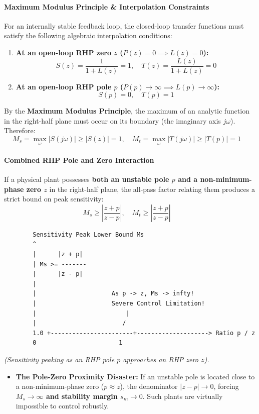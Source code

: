 \documentclass[12pt,onecolumn,twoside ]{article}
\begin{document}
	\paragraph{Maximum Modulus Principle \& Interpolation Constraints}
	For an internally stable feedback loop, the closed-loop transfer functions must satisfy the following algebraic interpolation conditions:
	\begin{enumerate}
		\item
		\textbf{At an open-loop RHP zero $z$ ($P(z) = 0 \implies L(z) = 0$):} \[
		S(z) = \frac{1}{1 + L(z)} = 1, \quad T(z) = \frac{L(z)}{1 + L(z)} = 0
		\]
		\item
		\textbf{At an open-loop RHP pole $p$ ($P(p) \to \infty \implies L(p) \to \infty$):} \[
		S(p) = 0, \quad T(p) = 1
		\]
	\end{enumerate}
	By the \textbf{Maximum Modulus Principle}, the maximum of an analytic function in the right-half plane must occur on its boundary (the imaginary axis $j\omega$). Therefore: \[
	M_s = \max_{\omega} |S(j\omega)| \ge |S(z)| = 1, \quad M_t = \max_{\omega} |T(j\omega)| \ge |T(p)| = 1 \quad
	\]
	\paragraph{Combined RHP Pole and Zero Interaction}
	If a physical plant possesses \textbf{both an unstable pole $p$ and a non-minimum-phase zero $z$} in the right-half plane, the all-pass factor relating them produces a strict bound on peak sensitivity:
	\[
	M_s \ge \left| \frac{z + p}{z - p} \right|, \quad M_t \ge \left| \frac{z + p}{z - p} \right| \quad
	\]
	\begin{lstlisting}
		Sensitivity Peak Lower Bound Ms
		^
		|      |z + p|
		| Ms >= -------
		|      |z - p|
		|
		|                     As p -> z, Ms -> infty!
		|                     Severe Control Limitation!
		|                         |
		|                        /
		1.0 +-----------------------+--------------------> Ratio p / z
		0                       1
	\end{lstlisting}
	\textit{(Sensitivity peaking as an RHP pole $p$ approaches an RHP zero $z$).}
	\begin{itemize}
		\item
		\textbf{The Pole-Zero Proximity Disaster:} If an unstable pole is located close to a non-minimum-phase zero ($p \approx z$), the denominator $|z - p| \to 0$, forcing \textbf{$M_s \to \infty$ and stability margin $s_m \to 0$}. Such plants are virtually impossible to control robustly.
	\end{itemize}
\end{document}
